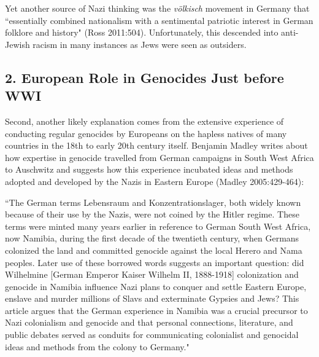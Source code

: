 Yet another source of Nazi thinking was the {\sl völkisch} movement in Germany that ``essentially combined nationalism with a sentimental patriotic interest in German folklore and history" (Ross 2011:504). Unfortunately, this descended into anti-Jewish racism in many instances as Jews were seen as outsiders.

\subsection*{2. European Role in Genocides Just before WWI}

Second, another likely explanation comes from the extensive experience of conducting regular genocides by Europeans on the hapless natives of many countries in the 18th to early 20th century itself. Benjamin Madley writes about how expertise in genocide travelled from German campaigns in South West Africa to Auschwitz and suggests how this experience incubated ideas and methods adopted and developed by the Nazis in Eastern Europe (Madley 2005:429-464):

\begin{myquote}
``The German terms Lebensraum and Konzentrationslager, both widely known because of their use by the Nazis, were not coined by the Hitler regime. These terms were minted many years earlier in reference to German South West Africa, now Namibia, during the first decade of the twentieth century, when Germans colonized the land and committed genocide against the local Herero and Nama peoples. Later use of these borrowed words suggests an important question: did Wilhelmine [German Emperor Kaiser Wilhelm II, 1888-1918] colonization and genocide in Namibia  influence Nazi plans to conquer and settle Eastern Europe, enslave and murder millions of Slavs and exterminate Gypsies and Jews? This article argues that the German experience in Namibia was a crucial precursor to Nazi colonialism and genocide and that personal connections, literature, and public debates served as conduits for communicating colonialist and genocidal ideas and methods from the colony to Germany."
\end{myquote}

